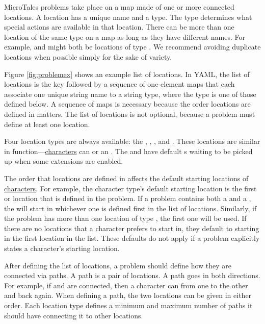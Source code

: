 \documentclass{nilreport}
\begin{document}
MicroTales problems take place on a map made of one or more connected locations. A location has a unique name and a type. The type determines what special actions are available in that location. There can be more than one location of the same type on a map as long as they have different names. For example,  and  might both be locations of type . We recommend avoiding duplicate locations when possible simply for the sake of variety.

Figure \ref{fig:problemex} shows an example list of locations. In YAML, the list of locations is the key  followed by a sequence of one-element maps that each associate one unique string name to a string type, where the type is one of those defined below. A sequence of maps is necessary because the order locations are defined in matters. The list of locations is not optional, because a problem must define at least one location.

Four location types are always available: the , , , and . These locations are similar in function---\hyperref[sec:characters]{characters} can  or  an . The  and  have default s waiting to be picked up when some extensions are enabled.

The order that locations are defined in affects the default starting locations of \hyperref[sec:characters]{characters}. For example, the  character type's default starting location is the first  or  location that is defined in the problem. If a problem contains both a  and a , the  will start in whichever one is defined first in the list of locations. Similarly, if the problem has more than one location of type , the first one will be used. If there are no locations that a character prefers to start in, they default to starting in the first location in the list. These defaults do not apply if a problem explicitly states a character's starting location.

After defining the list of locations, a problem should define how they are connected via paths. A path is a pair of locations. A path goes in both directions. For example, if  and  are connected, then a character can  from one to the other and back again. When defining a path, the two locations can be given in either order. Each location type defines a minimum and maximum number of paths it should have connecting it to other locations.
\end{document}
